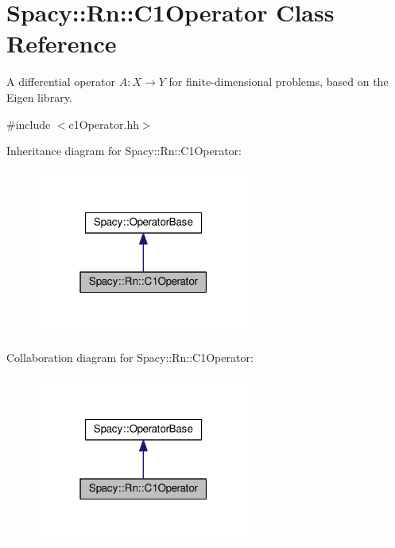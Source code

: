 \hypertarget{classSpacy_1_1Rn_1_1C1Operator}{}\section{Spacy\+:\+:Rn\+:\+:C1\+Operator Class Reference}
\label{classSpacy_1_1Rn_1_1C1Operator}


A differential operator $A:X\rightarrow Y$ for finite-\/dimensional problems, based on the Eigen library.  




{\ttfamily \#include $<$c1\+Operator.\+hh$>$}



Inheritance diagram for Spacy\+:\+:Rn\+:\+:C1\+Operator\+:
\nopagebreak
\begin{figure}[H]
\begin{center}
\leavevmode
\includegraphics[width=199pt]{classSpacy_1_1Rn_1_1C1Operator__inherit__graph}
\end{center}
\end{figure}


Collaboration diagram for Spacy\+:\+:Rn\+:\+:C1\+Operator\+:
\nopagebreak
\begin{figure}[H]
\begin{center}
\leavevmode
\includegraphics[width=199pt]{classSpacy_1_1Rn_1_1C1Operator__coll__graph}
\end{center}
\end{figure}
